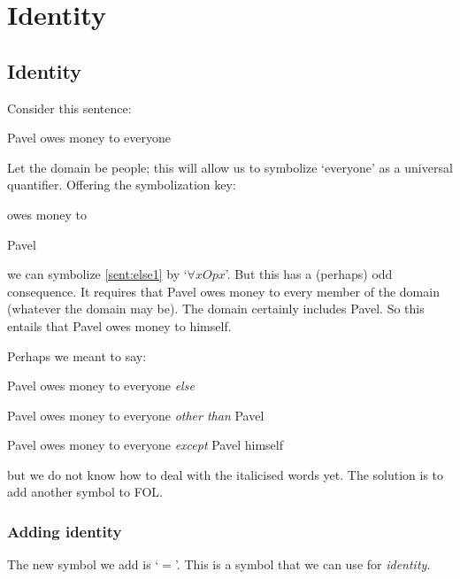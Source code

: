 \part{Identity}
\label{ch:identity}

\chapter{Identity}

Consider this sentence:
\begin{samplesent}
\item\label{sent:else1} Pavel owes money to everyone
\end{samplesent}
Let the domain be people; this will allow us to symbolize `everyone' as a universal quantifier. Offering the symbolization key:
	\begin{ekey}
		\item[Oxy]  owes money to 
		\item[p] Pavel
	\end{ekey}
we can symbolize \cref{sent:else1} by `$\forall x Opx$'. But this has a (perhaps) odd consequence. It requires that Pavel owes money to every member of the domain (whatever the domain may be). The domain certainly includes Pavel. So this entails that Pavel owes money to himself.

Perhaps we meant to say:
	\begin{samplesent}
		\item\label{sent:else1b} Pavel owes money to everyone \emph{else}
		\item\label{sent:else1c} Pavel owes money to everyone \emph{other than} Pavel
		\item\label{sent:else1d} Pavel owes money to everyone \emph{except} Pavel himself
	\end{samplesent}
but we do not know how to deal with the italicised words yet. The solution is to add another symbol to FOL.

\section{Adding identity}

The new symbol we add is `$=$'. This is a symbol that we can use for \emph{identity}.

